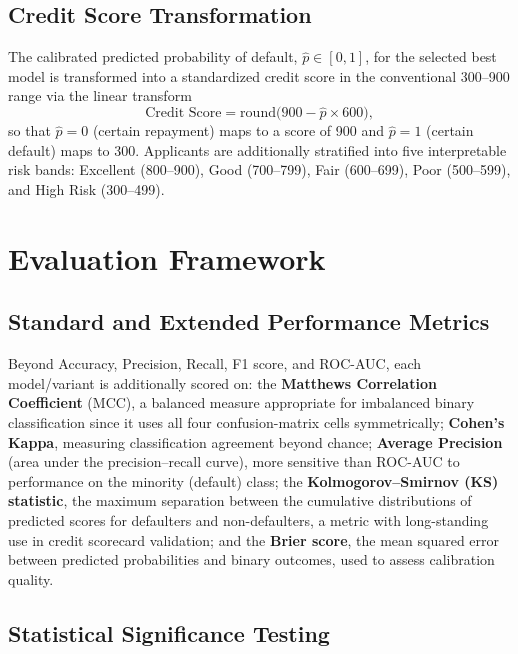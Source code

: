 \documentclass[journal]{IEEEtran}
\begin{document}
\subsection{Credit Score Transformation}
\label{sec:creditscore}

The calibrated predicted probability of default, $\hat{p} \in [0,1]$, for the selected best model is transformed into a standardized credit score in the conventional 300--900 range via the linear transform
\begin{equation}
\text{Credit Score} = \mathrm{round}\big(900 - \hat{p} \times 600\big),
\label{eq:score}
\end{equation}
so that $\hat{p}=0$ (certain repayment) maps to a score of 900 and $\hat{p}=1$ (certain default) maps to 300. Applicants are additionally stratified into five interpretable risk bands: Excellent (800--900), Good (700--799), Fair (600--699), Poor (500--599), and High Risk (300--499).

\section{Evaluation Framework}
\label{sec:evalframework}

\subsection{Standard and Extended Performance Metrics}

Beyond Accuracy, Precision, Recall, F1 score, and ROC-AUC, each model/variant is additionally scored on: the \textbf{Matthews Correlation Coefficient} (MCC), a balanced measure appropriate for imbalanced binary classification since it uses all four confusion-matrix cells symmetrically; \textbf{Cohen's Kappa}, measuring classification agreement beyond chance; \textbf{Average Precision} (area under the precision--recall curve), more sensitive than ROC-AUC to performance on the minority (default) class; the \textbf{Kolmogorov--Smirnov (KS) statistic}, the maximum separation between the cumulative distributions of predicted scores for defaulters and non-defaulters, a metric with long-standing use in credit scorecard validation; and the \textbf{Brier score}, the mean squared error between predicted probabilities and binary outcomes, used to assess calibration quality.

\subsection{Statistical Significance Testing}
\end{document}
